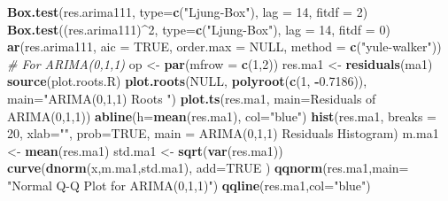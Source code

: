 \documentclass[
]{article}
\newenvironment{Shaded}{\begin{snugshade}}{\end{snugshade}}
\newcommand{\AttributeTok}[1]{\textcolor[rgb]{0.13,0.29,0.53}{#1}}
\newcommand{\CommentTok}[1]{\textcolor[rgb]{0.56,0.35,0.01}{\textit{#1}}}
\newcommand{\ConstantTok}[1]{\textcolor[rgb]{0.56,0.35,0.01}{#1}}
\newcommand{\DecValTok}[1]{\textcolor[rgb]{0.00,0.00,0.81}{#1}}
\newcommand{\FloatTok}[1]{\textcolor[rgb]{0.00,0.00,0.81}{#1}}
\newcommand{\FunctionTok}[1]{\textcolor[rgb]{0.13,0.29,0.53}{\textbf{#1}}}
\newcommand{\NormalTok}[1]{#1}
\newcommand{\OtherTok}[1]{\textcolor[rgb]{0.56,0.35,0.01}{#1}}
\newcommand{\SpecialCharTok}[1]{\textcolor[rgb]{0.81,0.36,0.00}{\textbf{#1}}}
\newcommand{\StringTok}[1]{\textcolor[rgb]{0.31,0.60,0.02}{#1}}
\begin{document}
\begin{Shaded}
\begin{Highlighting}[]
\FunctionTok{Box.test}\NormalTok{(res.arima111, }\AttributeTok{type=}\FunctionTok{c}\NormalTok{(}\StringTok{"Ljung{-}Box"}\NormalTok{), }\AttributeTok{lag =} \DecValTok{14}\NormalTok{, }\AttributeTok{fitdf =} \DecValTok{2}\NormalTok{)}
\FunctionTok{Box.test}\NormalTok{((res.arima111)}\SpecialCharTok{\^{}}\DecValTok{2}\NormalTok{, }\AttributeTok{type=}\FunctionTok{c}\NormalTok{(}\StringTok{"Ljung{-}Box"}\NormalTok{), }\AttributeTok{lag =} \DecValTok{14}\NormalTok{, }\AttributeTok{fitdf =} \DecValTok{0}\NormalTok{)}
\FunctionTok{ar}\NormalTok{(res.arima111, }\AttributeTok{aic =} \ConstantTok{TRUE}\NormalTok{, }\AttributeTok{order.max =} \ConstantTok{NULL}\NormalTok{, }\AttributeTok{method =} \FunctionTok{c}\NormalTok{(}\StringTok{"yule{-}walker"}\NormalTok{))}
\CommentTok{\# For ARIMA(0,1,1)}
\NormalTok{op }\OtherTok{\textless{}{-}} \FunctionTok{par}\NormalTok{(}\AttributeTok{mfrow =} \FunctionTok{c}\NormalTok{(}\DecValTok{1}\NormalTok{,}\DecValTok{2}\NormalTok{))}
\NormalTok{res.ma1 }\OtherTok{\textless{}{-}} \FunctionTok{residuals}\NormalTok{(ma1)}
\FunctionTok{source}\NormalTok{(}\StringTok{\textquotesingle{}plot.roots.R\textquotesingle{}}\NormalTok{)}
\FunctionTok{plot.roots}\NormalTok{(}\ConstantTok{NULL}\NormalTok{, }\FunctionTok{polyroot}\NormalTok{(}\FunctionTok{c}\NormalTok{(}\DecValTok{1}\NormalTok{, }\SpecialCharTok{{-}}\FloatTok{0.7186}\NormalTok{)), }\AttributeTok{main=}\StringTok{"ARIMA(0,1,1) Roots "}\NormalTok{)}
\FunctionTok{plot.ts}\NormalTok{(res.ma1, }\AttributeTok{main=}\StringTok{\textquotesingle{}Residuals of ARIMA(0,1,1)\textquotesingle{}}\NormalTok{)}
\FunctionTok{abline}\NormalTok{(}\AttributeTok{h=}\FunctionTok{mean}\NormalTok{(res.ma1), }\AttributeTok{col=}\StringTok{"blue"}\NormalTok{)}
\FunctionTok{hist}\NormalTok{(res.ma1, }\AttributeTok{breaks =} \DecValTok{20}\NormalTok{, }\AttributeTok{xlab=}\StringTok{""}\NormalTok{, }\AttributeTok{prob=}\ConstantTok{TRUE}\NormalTok{, }
     \AttributeTok{main =} \StringTok{\textquotesingle{}ARIMA(0,1,1) Residuals Histogram\textquotesingle{}}\NormalTok{)}
\NormalTok{m.ma1 }\OtherTok{\textless{}{-}} \FunctionTok{mean}\NormalTok{(res.ma1)}
\NormalTok{std.ma1 }\OtherTok{\textless{}{-}} \FunctionTok{sqrt}\NormalTok{(}\FunctionTok{var}\NormalTok{(res.ma1))}
\FunctionTok{curve}\NormalTok{(}\FunctionTok{dnorm}\NormalTok{(x,m.ma1,std.ma1), }\AttributeTok{add=}\ConstantTok{TRUE}\NormalTok{ )}
\FunctionTok{qqnorm}\NormalTok{(res.ma1,}\AttributeTok{main=} \StringTok{"Normal Q{-}Q Plot for ARIMA(0,1,1)"}\NormalTok{)}
\FunctionTok{qqline}\NormalTok{(res.ma1,}\AttributeTok{col=}\StringTok{"blue"}\NormalTok{)}

\end{Highlighting}
\end{Shaded}
\end{document}

